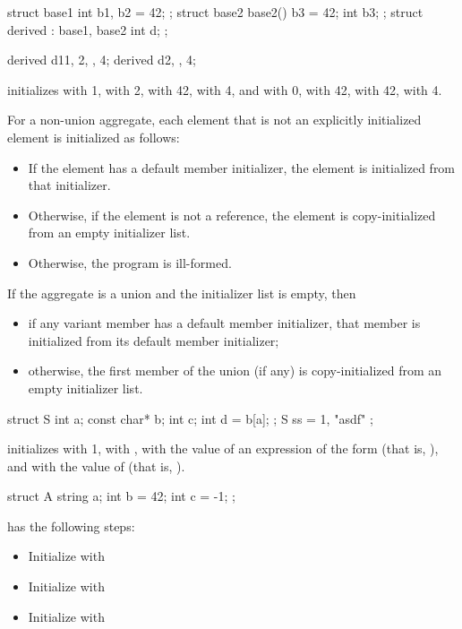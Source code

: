 \begin{itemize}
\begin{example}
\begin{codeblock}
struct base1 { int b1, b2 = 42; };
struct base2 {
  base2() {
    b3 = 42;
  }
  int b3;
};
struct derived : base1, base2 {
  int d;
};

derived d1{{1, 2}, {}, 4};
derived d2{{}, {}, 4};
\end{codeblock}
initializes
 with 1,
 with 2,
 with 42,
 with 4, and
 with 0,
 with 42,
 with 42,
 with 4.
\end{example}
\end{itemize}

\pnum
For a non-union aggregate,
each element that is not an explicitly initialized element
is initialized as follows:
\begin{itemize}
\item
If the element has a default member initializer,
the element is initialized from that initializer.
\item
Otherwise, if the element is not a reference, the element
is copy-initialized from an empty initializer list.
\item
Otherwise, the program is ill-formed.
\end{itemize}
If the aggregate is a union and the initializer list is empty, then
\begin{itemize}
\item
if any variant member has a default member initializer,
that member is initialized from its default member initializer;
\item
otherwise, the first member of the union (if any)
is copy-initialized from an empty initializer list.
\end{itemize}

\pnum
\begin{example}
\begin{codeblock}
struct S { int a; const char* b; int c; int d = b[a]; };
S ss = { 1, "asdf" };
\end{codeblock}
initializes
with 1,
with ,
with the value of an expression of the form
(that is, ), and  with the value of 
(that is, ).

\begin{codeblock}
struct A {
  string a;
  int b = 42;
  int c = -1;
};
\end{codeblock}

 has the following steps:
\begin{itemize}
\item Initialize  with \tcode{\{\}}
\item Initialize  with 
\item Initialize  with 
\end{itemize}
\end{example}

